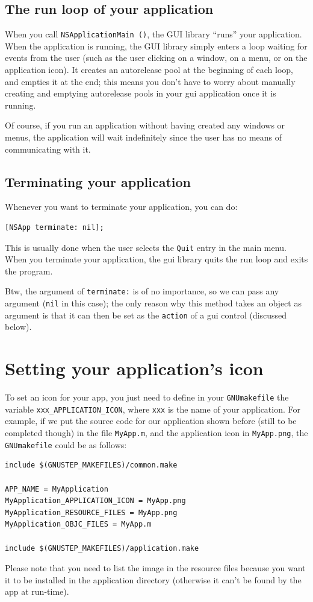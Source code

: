\documentclass[a4paper]{article}
\begin{document}
\subsection{The run loop of your application}
When you call \texttt{NSApplicationMain ()}, the GUI library ``runs''
your application.  When the application is running, the GUI library
simply enters a loop waiting for events from the user (such as the
user clicking on a window, on a menu, or on the application icon).  It
creates an autorelease pool at the beginning of each loop, and empties
it at the end; this means you don't have to worry about manually
creating and emptying autorelease pools in your gui application once
it is running.

Of course, if you run an application without having created any
windows or menus, the application will wait indefinitely since the
user has no means of communicating with it.

\subsection{Terminating your application}
Whenever you want to terminate your application, you can do: 
\begin{verbatim}
[NSApp terminate: nil];
\end{verbatim}
This is usually done when the user selects the \texttt{Quit} entry in
the main menu.  When you terminate your application, the gui library
quits the run loop and exits the program.

Btw, the argument of \texttt{terminate:} is of no importance, so we
can pass any argument (\texttt{nil} in this case); the only reason why
this method takes an object as argument is that it can then be set as
the \texttt{action} of a gui control (discussed below).

\section{Setting your application's icon}
To set an icon for your app, you just need to define in your
\texttt{GNUmakefile} the variable \texttt{xxx\_APPLICATION\_ICON},
where \texttt{xxx} is the name of your application.  For example, if
we put the source code for our application shown before (still to be
completed though) in the file \texttt{MyApp.m}, and the application
icon in \texttt{MyApp.png}, the \texttt{GNUmakefile} could be as
follows:
\begin{verbatim}
include $(GNUSTEP_MAKEFILES)/common.make

APP_NAME = MyApplication
MyApplication_APPLICATION_ICON = MyApp.png
MyApplication_RESOURCE_FILES = MyApp.png
MyApplication_OBJC_FILES = MyApp.m 

include $(GNUSTEP_MAKEFILES)/application.make
\end{verbatim}
Please note that you need to list the image in the resource files
because you want it to be installed in the application directory
(otherwise it can't be found by the app at run-time).
\end{document}
